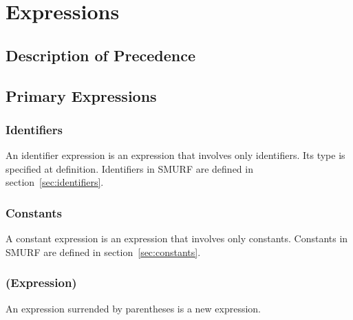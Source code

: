 \section{Expressions}

\subsection{Description of Precedence}


\subsection{Primary Expressions}

\subsubsection{Identifiers}
An identifier expression is an expression that involves only identifiers. Its 
type is specified at definition. Identifiers in SMURF are defined in 
section~\ref{sec:identifiers}.

\subsubsection{Constants}
A constant expression is an expression that involves only constants. Constants 
in SMURF are defined in section~\ref{sec:constants}.

\subsubsection{(Expression)}
An expression surrended by parentheses is a new expression.

